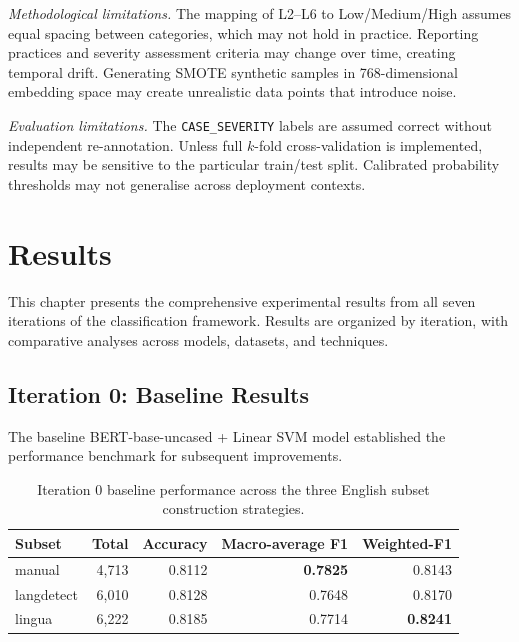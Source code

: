 \documentclass[11pt, titlepage, bibliography=totoc]{scrreprt}
\begin{document}
\textit{Methodological limitations.} The mapping of L2--L6 to Low/Medium/High assumes equal spacing between categories, which may not hold in practice. Reporting practices and severity assessment criteria may change over time, creating temporal drift. Generating SMOTE synthetic samples in 768-dimensional embedding space may create unrealistic data points that introduce noise.

\textit{Evaluation limitations.} The \texttt{CASE\_SEVERITY} labels are assumed correct without independent re-annotation. Unless full $k$-fold cross-validation is implemented, results may be sensitive to the particular train/test split. Calibrated probability thresholds may not generalise across deployment contexts.

\chapter{Results}

This chapter presents the comprehensive experimental results from all seven iterations of the classification framework. Results are organized by iteration, with comparative analyses across models, datasets, and techniques.

\section{Iteration 0: Baseline Results}

The baseline BERT-base-uncased + Linear SVM model established the performance benchmark for subsequent improvements.

\begin{table}[htbp]
\centering
\caption{Iteration 0 baseline performance across the three English subset construction strategies.}
\label{tab:results-iter0}
\begin{tabular}{lrrrr}
\toprule
\textbf{Subset} & \textbf{Total} & \textbf{Accuracy} & \textbf{Macro-average F1} & \textbf{Weighted-F1} \\
\midrule
manual     & 4,713 & 0.8112 & \textbf{0.7825} & 0.8143 \\
langdetect & 6,010 & 0.8128 & 0.7648 & 0.8170 \\
lingua     & 6,222 & 0.8185 & 0.7714 & \textbf{0.8241} \\
\bottomrule
\end{tabular}
\end{table}
\end{document}
